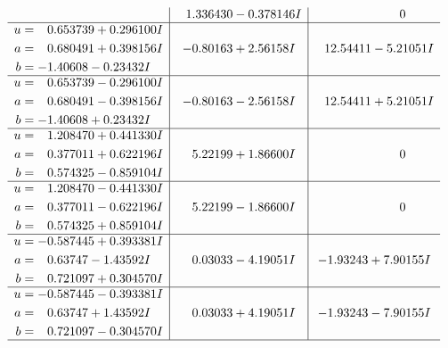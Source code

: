 \documentclass[1p]{elsarticle_modified}
\theoremstyle{definition}
\begin{document}
$$\begin{array}{c|c|c}
 & \phantom{-}1.336430 - 0.378146 I & \phantom{-0.000000 } 0 \\ \hline\begin{aligned}
u &= \phantom{-}0.653739 + 0.296100 I \\
a &= \phantom{-}0.680491 + 0.398156 I \\
b &= -1.40608 - 0.23432 I\end{aligned}
 & -0.80163 + 2.56158 I & \phantom{-}12.54411 - 5.21051 I \\ \hline\begin{aligned}
u &= \phantom{-}0.653739 - 0.296100 I \\
a &= \phantom{-}0.680491 - 0.398156 I \\
b &= -1.40608 + 0.23432 I\end{aligned}
 & -0.80163 - 2.56158 I & \phantom{-}12.54411 + 5.21051 I \\ \hline\begin{aligned}
u &= \phantom{-}1.208470 + 0.441330 I \\
a &= \phantom{-}0.377011 + 0.622196 I \\
b &= \phantom{-}0.574325 - 0.859104 I\end{aligned}
 & \phantom{-}5.22199 + 1.86600 I & \phantom{-0.000000 } 0 \\ \hline\begin{aligned}
u &= \phantom{-}1.208470 - 0.441330 I \\
a &= \phantom{-}0.377011 - 0.622196 I \\
b &= \phantom{-}0.574325 + 0.859104 I\end{aligned}
 & \phantom{-}5.22199 - 1.86600 I & \phantom{-0.000000 } 0 \\ \hline\begin{aligned}
u &= -0.587445 + 0.393381 I \\
a &= \phantom{-}0.63747 - 1.43592 I \\
b &= \phantom{-}0.721097 + 0.304570 I\end{aligned}
 & \phantom{-}0.03033 - 4.19051 I & -1.93243 + 7.90155 I \\ \hline\begin{aligned}
u &= -0.587445 - 0.393381 I \\
a &= \phantom{-}0.63747 + 1.43592 I \\
b &= \phantom{-}0.721097 - 0.304570 I\end{aligned}
 & \phantom{-}0.03033 + 4.19051 I & -1.93243 - 7.90155 I\\
 \hline 
 \end{array}$$\newpage$$\begin{array}{c|c|c}  

\end{array}$$
\end{document}
